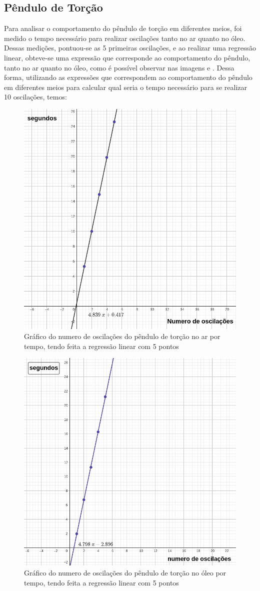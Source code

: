 \subsection{Pêndulo de Torção}  

Para analisar o comportamento do pêndulo de torção em diferentes meios, foi medido o tempo necessário para realizar oscilações tanto no 
ar quanto no óleo. Dessas medições, pontuou-se as 5 primeiras oscilações, e ao realizar uma regressão linear, obteve-se uma expressão que corresponde
ao comportamento do pêndulo, tanto no ar quanto no óleo, como é possível observar nas imagens \label{Troçãonoar} e \label{Torçãonoóleo}.
Dessa forma, utilizando as expressões que correspondem ao comportamento do pêndulo em diferentes meios para calcular qual seria o tempo necessário
para se realizar 10 oscilações, temos:

\begin{figure}[H]
	\centering
	\includegraphics[width=0.35\linewidth]{fig/Torção no ar.png}
	\caption{Gráfico do numero de oscilações do pêndulo de torção no ar por tempo, tendo feita a regressão linear com 5 pontos}
	\label{Torçãonoar}
\end{figure}

\begin{figure}[H]
	\centering
	\includegraphics[width=0.35\linewidth]{fig/Oscilações no óleo.png}
	\caption{Gráfico do numero de oscilações do pêndulo de torção no óleo por tempo, tendo feita a regressão linear com 5 pontos}
	\label{Torçãonoóleo}
\end{figure}

